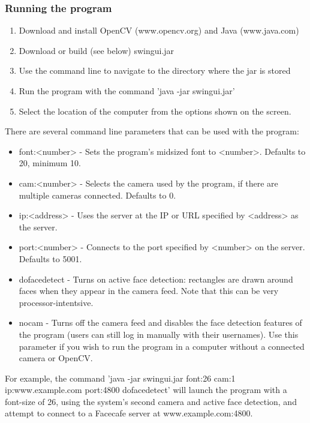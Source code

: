 \documentclass[11pt]{article}
\begin{document}
\subsubsection*{Running the program}
\begin{enumerate}
\item{Download and install OpenCV (www.opencv.org) and 
Java (www.java.com)}
\item{Download or build (see below) swingui.jar}
\item{Use the command line to navigate to the directory where the jar is stored}
\item{Run the program with the command 'java -jar swingui.jar'}
\item{Select the location of the computer from the options shown on the screen.}
\end{enumerate}
There are several command line parameters that can be used with the program:
\begin{itemize}
\item{font:<number> - Sets the program's midsized font to <number>. Defaults to 20, minimum 10.}
\item{cam:<number> - Selects the camera used by the program, if there are multiple 
cameras connected. Defaults to 0.}
\item{ip:<address> - Uses the server at the IP or URL specified by <address> as the server.}
\item{port:<number> - Connects to the port specified by <number> on the server. Defaults to 5001.}
\item{dofacedetect - Turns on active face detection: rectangles are drawn around faces when they
appear in the camera feed. Note that this can be very processor-intentsive.}
\item{nocam - Turns off the camera feed and disables the face detection features of the program
(users can still log in manually with their usernames). Use this parameter if you wish to run the
program in a computer without a connected camera or OpenCV.}
\end{itemize}
For example, the command 'java -jar swingui.jar font:26 cam:1 
ip:www.example.com port:4800 dofacedetect' will launch the program with a 
font-size of 26, using the system's second camera and active face detection, 
and attempt to connect to a Facecafe server at www.example.com:4800.
\end{document}
